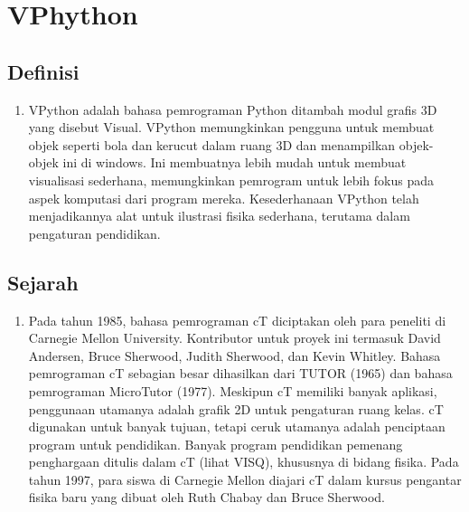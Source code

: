 

\section{VPhython}
\subsection{Definisi}
		\begin{enumerate}
			\item VPython adalah bahasa pemrograman Python ditambah modul grafis 3D yang disebut Visual. VPython memungkinkan pengguna untuk membuat objek seperti bola dan kerucut dalam ruang 3D dan menampilkan objek-objek ini di windows. Ini membuatnya lebih mudah untuk membuat visualisasi sederhana, memungkinkan pemrogram untuk lebih fokus pada aspek komputasi dari program mereka. Kesederhanaan VPython telah menjadikannya alat untuk ilustrasi fisika sederhana, terutama dalam pengaturan pendidikan.
		\end{enumerate}
\subsection{Sejarah}
		\begin{enumerate}
			\item Pada tahun 1985, bahasa pemrograman cT diciptakan oleh para peneliti di Carnegie Mellon University. Kontributor untuk proyek ini termasuk David Andersen, Bruce Sherwood, Judith Sherwood, dan Kevin Whitley. Bahasa pemrograman cT sebagian besar dihasilkan dari TUTOR (1965) dan bahasa pemrograman MicroTutor (1977). Meskipun cT memiliki banyak aplikasi, penggunaan utamanya adalah grafik 2D untuk pengaturan ruang kelas. cT digunakan untuk banyak tujuan, tetapi ceruk utamanya adalah penciptaan program untuk pendidikan. Banyak program pendidikan pemenang penghargaan ditulis dalam cT (lihat VISQ), khususnya di bidang fisika. Pada tahun 1997, para siswa di Carnegie Mellon diajari cT dalam kursus pengantar fisika baru yang dibuat oleh Ruth Chabay dan Bruce Sherwood.
		\end{enumerate}
